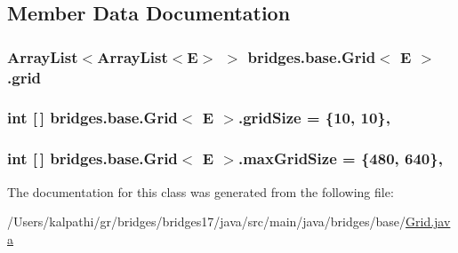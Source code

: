 \subsection{Member Data Documentation}
\hypertarget{classbridges_1_1base_1_1_grid_ad1f3f6968d58188425bd992c05c655a6}{}
\subsubsection[{grid}]{\setlength{\rightskip}{0pt plus 5cm}Array\+List$<$Array\+List$<$E$>$ $>$ {\bf bridges.\+base.\+Grid}$<$ E $>$.grid\hspace{0.3cm}{\ttfamily [protected]}}\label{classbridges_1_1base_1_1_grid_ad1f3f6968d58188425bd992c05c655a6}
\hypertarget{classbridges_1_1base_1_1_grid_a54a66479f78022570253d771206a0420}{}
\subsubsection[{grid\+Size}]{\setlength{\rightskip}{0pt plus 5cm}int \mbox{[}$\,$\mbox{]} {\bf bridges.\+base.\+Grid}$<$ E $>$.grid\+Size = \{10, 10\}\hspace{0.3cm}{\ttfamily [static]}, {\ttfamily [protected]}}\label{classbridges_1_1base_1_1_grid_a54a66479f78022570253d771206a0420}
\hypertarget{classbridges_1_1base_1_1_grid_a803fd4c070a22863c82581f0bb258c1c}{}
\subsubsection[{max\+Grid\+Size}]{\setlength{\rightskip}{0pt plus 5cm}int \mbox{[}$\,$\mbox{]} {\bf bridges.\+base.\+Grid}$<$ E $>$.max\+Grid\+Size = \{480, 640\}\hspace{0.3cm}{\ttfamily [static]}, {\ttfamily [protected]}}\label{classbridges_1_1base_1_1_grid_a803fd4c070a22863c82581f0bb258c1c}


The documentation for this class was generated from the following file\+:\begin{DoxyCompactItemize}
\item 
/\+Users/kalpathi/gr/bridges/bridges17/java/src/main/java/bridges/base/\hyperlink{_grid_8java}{Grid.\+java}\end{DoxyCompactItemize}
